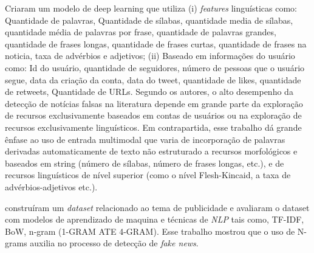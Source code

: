 \citet{Mouratidis20211} Criaram um modelo de deep learning que utiliza (i) \textit{features} linguísticas como: Quantidade de palavras, Quantidade de sílabas, quantidade media de sílabas, quantidade média de palavras por frase, quantidade de palavras grandes, quantidade de frases longas, quantidade de frases curtas, quantidade de frases na noticia, taxa de advérbios e adjetivos; (ii) Baseado em informações do usuário como: Id do usuário, quantidade de seguidores, número de pessoas que o usuário segue, data da criação da conta, data do tweet, quantidade de likes, quantidade de retweets, Quantidade de URLs. Segundo os autores, o alto desempenho da detecção de notícias falsas na literatura depende em grande parte da exploração de recursos exclusivamente baseados em contas de usuários ou na exploração de recursos exclusivamente linguísticos. Em contrapartida, esse trabalho dá grande ênfase ao uso de entrada multimodal que varia de incorporação de palavras derivadas automaticamente de texto não estruturado a recursos morfológicos e baseados em string (número de sílabas, número de frases longas, etc.), e de recursos linguísticos de nível superior (como o nível Flesh-Kincaid, a taxa de advérbios-adjetivos etc.).

\citet{Setiawan2021} construíram um \textit{dataset} relacionado ao tema de publicidade e avaliaram o dataset com modelos de aprendizado de maquina e técnicas de \textit{NLP} tais como, TF-IDF, BoW, n-gram (1-GRAM ATE 4-GRAM). 
Esse trabalho mostrou que o uso de N-grams auxilia no processo de detecção de \textit{fake news}.


